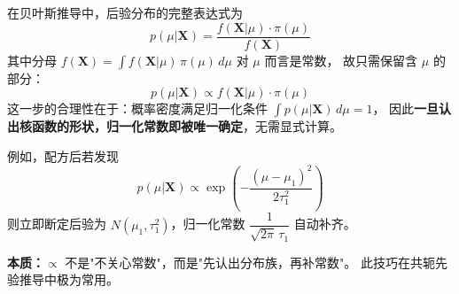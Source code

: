 \begin{note}
在贝叶斯推导中，后验分布的完整表达式为
\[
p(\mu|\boldsymbol{X}) = \frac{f(\boldsymbol{X}|\mu)\cdot\pi(\mu)}{f(\boldsymbol{X})}
\]
其中分母 $f(\boldsymbol{X}) = \int f(\boldsymbol{X}|\mu)\,\pi(\mu)\,d\mu$ 对 $\mu$ 而言是常数，
故只需保留含 $\mu$ 的部分：
\[
p(\mu|\boldsymbol{X}) \propto f(\boldsymbol{X}|\mu)\cdot\pi(\mu)
\]
这一步的合理性在于：概率密度满足归一化条件 $\int p(\mu|\boldsymbol{X})\,d\mu = 1$，
因此\textbf{一旦认出核函数的形状，归一化常数即被唯一确定}，无需显式计算。

例如，配方后若发现
\[
p(\mu|\boldsymbol{X}) \propto \exp\!\left(-\frac{(\mu-\mu_1)^2}{2\tau_1^2}\right)
\]
则立即断定后验为 $N(\mu_1,\tau_1^2)$，归一化常数 $\dfrac{1}{\sqrt{2\pi}\,\tau_1}$ 自动补齐。

\textbf{本质：}$\propto$ 不是"不关心常数"，而是"先认出分布族，再补常数"。
此技巧在共轭先验推导中极为常用。
\end{note}
